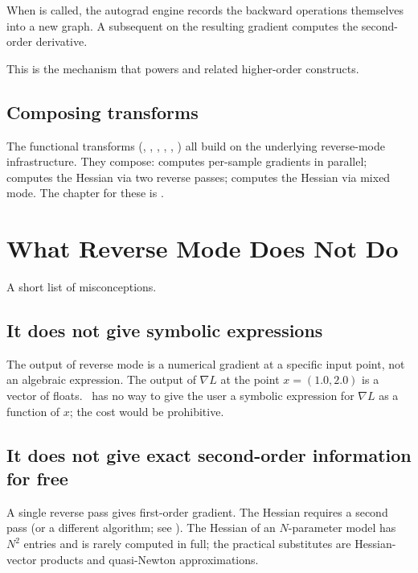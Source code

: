When  is called, the autograd
engine records the backward operations themselves into a new
graph. A subsequent  on the resulting gradient
computes the second-order derivative.

This is the mechanism that powers  and
related higher-order constructs.

\subsection{Composing transforms}
\label{ssec:ad_theory:composing}

The functional transforms (, , ,
, , ) all build on the
underlying reverse-mode infrastructure. They compose:  computes per-sample gradients in parallel;  computes the Hessian via two reverse passes;
 computes the Hessian via mixed mode. The
chapter for these is .

\section{What Reverse Mode Does Not Do}
\label{sec:ad_theory:not_do}

A short list of misconceptions.

\subsection{It does not give symbolic expressions}
\label{ssec:ad_theory:no_symbolic}

The output of reverse mode is a numerical gradient at a specific
input point, not an algebraic expression. The output of $\nabla L$
at the point $x = (1.0, 2.0)$ is a vector of floats. \Lucid\ has
no way to give the user a symbolic expression for $\nabla L$ as a
function of $x$; the cost would be prohibitive.

\subsection{It does not give exact second-order information for free}
\label{ssec:ad_theory:no_free_second}

A single reverse pass gives first-order gradient. The Hessian
requires a second pass (or a different algorithm; see
). The Hessian of an $N$-parameter model
has $N^2$ entries and is rarely computed in full; the practical
substitutes are Hessian-vector products and quasi-Newton
approximations.

